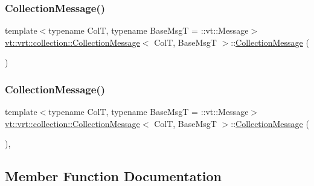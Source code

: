 \subsubsection{\texorpdfstring{Collection\+Message()}{CollectionMessage()}\hspace{0.1cm}{\footnotesize\ttfamily [1/2]}}
{\footnotesize\ttfamily template$<$typename ColT, typename Base\+MsgT = \+::vt\+::\+Message$>$ \\
\hyperlink{structvt_1_1vrt_1_1collection_1_1_collection_message}{vt\+::vrt\+::collection\+::\+Collection\+Message}$<$ ColT, Base\+MsgT $>$\+::\hyperlink{structvt_1_1vrt_1_1collection_1_1_collection_message}{Collection\+Message} (\begin{DoxyParamCaption}{ }\end{DoxyParamCaption})\hspace{0.3cm}{\ttfamily [default]}}

\mbox{\label{structvt_1_1vrt_1_1collection_1_1_collection_message_a8012bc5471893e2daedeab8aa4ed1509}} 
\subsubsection{\texorpdfstring{Collection\+Message()}{CollectionMessage()}\hspace{0.1cm}{\footnotesize\ttfamily [2/2]}}
{\footnotesize\ttfamily template$<$typename ColT, typename Base\+MsgT = \+::vt\+::\+Message$>$ \\
\hyperlink{structvt_1_1vrt_1_1collection_1_1_collection_message}{vt\+::vrt\+::collection\+::\+Collection\+Message}$<$ ColT, Base\+MsgT $>$\+::\hyperlink{structvt_1_1vrt_1_1collection_1_1_collection_message}{Collection\+Message} (\begin{DoxyParamCaption}\item[{Col\+Msg\+Wrap\+Tag\+Type}]{ }\end{DoxyParamCaption})\hspace{0.3cm}{\ttfamily [inline]}, {\ttfamily [explicit]}}



\subsection{Member Function Documentation}
\mbox{\label{structvt_1_1vrt_1_1collection_1_1_collection_message_a81604b8f38e3ee3eea6caf6a1012175c}} 
